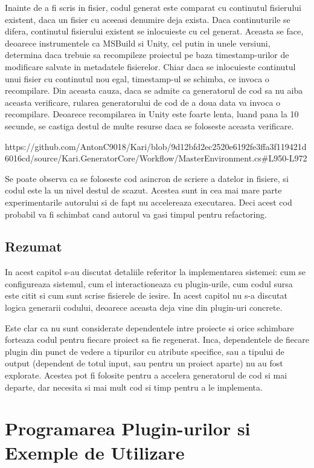 \documentclass{report}
\begin{document}
Inainte de a fi scris in fisier, codul generat este comparat cu
continutul fisierului existent, daca un fisier cu aceeasi denumire deja
exista. Daca continuturile se difera, continutul fisierului existent se
inlocuieste cu cel generat. Aceasta se face, deoarece instrumentele ca
MSBuild si Unity, cel putin in unele versiuni, determina daca trebuie sa
recompileze proiectul pe baza timestamp-urilor de modificare salvate in
metadatele fisierelor. Chiar daca se inlocuieste continutul unui fisier
cu continutul nou egal, timestamp-ul se schimba, ce invoca o
recompilare. Din aceasta cauza, daca se admite ca generatorul de cod sa
nu aiba aceasta verificare, rularea generatorului de cod de a doua data
va invoca o recompilare. Deoarece recompilarea in Unity este foarte
lenta, luand pana la 10 secunde, se castiga destul de multe resurse daca
se foloseste aceasta verificare.

https://github.com/AntonC9018/Kari/blob/9d12bfd2ec2520e6192fe3ffa3f119421d6016cd/source/Kari.GeneratorCore/Workflow/MasterEnvironment.cs\#L950-L972

Se poate observa ca se foloseste cod asincron de scriere a datelor in
fisiere, si codul este la un nivel destul de scazut. Acestea sunt in cea
mai mare parte experimentarile autorului si de fapt nu accelereaza
executarea. Deci acest cod probabil va fi schimbat cand autorul va gasi
timpul pentru refactoring.

\section{Rezumat}

In acest capitol s-au discutat detaliile referitor la implementarea
sistemei: cum se configureaza sistemul, cum el interactioneaza cu
plugin-urile, cum codul sursa este citit si cum sunt scrise fisierele de
iesire. In acest capitol nu s-a discutat logica generarii codului,
deoarece aceasta deja vine din plugin-uri concrete.

Este clar ca nu sunt considerate dependentele intre proiecte si orice
schimbare forteaza codul pentru fiecare proiect sa fie regenerat. Inca,
dependentele de fiecare plugin din punct de vedere a tipurilor cu
atribute specifice, sau a tipului de output (dependent de totul input,
sau pentru un proiect aparte) nu au fost explorate. Acestea pot fi
folosite pentru a accelera generatorul de cod si mai departe, dar
necesita si mai mult cod si timp pentru a le implementa.

\chapter{Programarea Plugin-urilor si Exemple de Utilizare}
\end{document}
